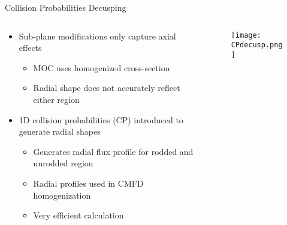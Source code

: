 \begin{frame}[t]{Collision Probabilities Decusping}
    
\begin{columns}
    \begin{column}{0.45\textwidth}
      \begin{itemize}
        \item Sub-plane modifications only capture axial effects
        \begin{itemize}
          \item MOC uses homogenized cross-section
          \item Radial shape does not accurately reflect either region
        \end{itemize}
        \item 1D collision probabilities (CP) introduced to generate radial 
        shapes
        \begin{itemize}
          \item Generates radial flux profile for rodded and unrodded region
          \item Radial profiles used in CMFD homogenization
          \item Very efficient calculation
        \end{itemize}
      \end{itemize}
    \end{column}
    \begin{column}{0.55\textwidth}
    \begin{figure}[h]
      \centering
      \texttt{[image: CPdecusp.png]}
    \end{figure}
\end{column}
\end{columns}
    
\end{frame}